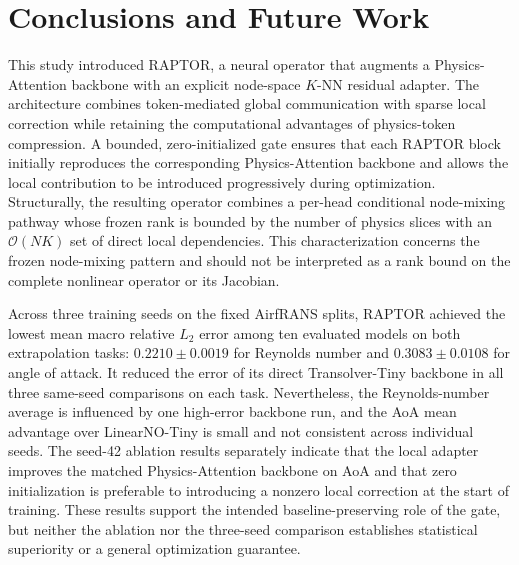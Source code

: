 \documentclass[a4paper,fleqn]{cas-sc}
\begin{document}
\section{Conclusions and Future Work}
\label{sec:conclusion}

This study introduced RAPTOR, a neural operator that augments a
Physics-Attention backbone with an explicit node-space \(K\)-NN residual
adapter. The architecture combines token-mediated global communication with
sparse local correction while retaining the computational advantages of
physics-token compression. A bounded, zero-initialized gate ensures that each
RAPTOR block initially reproduces the corresponding Physics-Attention
backbone and allows the local contribution to be introduced progressively
during optimization. Structurally, the resulting operator combines a
per-head conditional node-mixing pathway whose frozen rank is bounded by the
number of physics slices with an \(\mathcal{O}(NK)\) set of direct local
dependencies. This characterization concerns the frozen node-mixing pattern
and should not be interpreted as a rank bound on the complete nonlinear
operator or its Jacobian.

Across three training seeds on the fixed AirfRANS splits, RAPTOR achieved
the lowest mean macro relative \(L_2\) error among ten evaluated models
on both extrapolation tasks: \(0.2210\pm0.0019\) for Reynolds number and
\(0.3083\pm0.0108\) for angle of attack. It reduced the error of its
direct Transolver-Tiny backbone in all three same-seed comparisons on
each task. Nevertheless, the Reynolds-number average is influenced by
one high-error backbone run, and the AoA mean advantage over
LinearNO-Tiny is small and not consistent across individual seeds.
The seed-42 ablation results separately indicate that the local adapter
improves the matched Physics-Attention backbone on AoA and that zero
initialization is preferable to introducing a nonzero local correction
at the start of training. These results support the intended
baseline-preserving role of the gate, but neither the ablation nor the
three-seed comparison establishes statistical superiority or a general
optimization guarantee.
\end{document}
